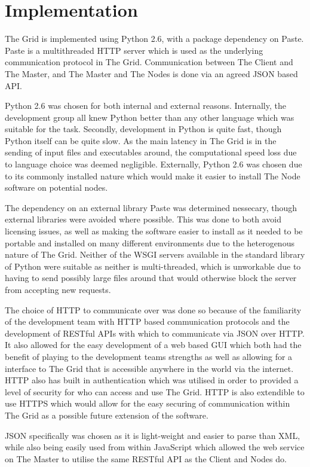 \chapter{Implementation}
The Grid is implemented using Python 2.6, with a package dependency on Paste. Paste is a multithreaded HTTP server which is used as the underlying communication protocol in The Grid. Communication between The Client and The Master, and The Master and The Nodes is done via an agreed JSON based API.

Python 2.6 was chosen for both internal and external reasons. Internally, the development group all knew Python better than any other language which was suitable for the task. Secondly, development in Python is quite fast, though Python itself can be quite slow. As the main latency in The Grid is in the sending of input files and executables around, the computational speed loss due to language choice was deemed negligible. Externally, Python 2.6 was chosen due to its commonly installed nature which would make it easier to install The Node software on potential nodes.

The dependency on an external library Paste was determined nessecary, though external libraries were avoided where possible. This was done to both avoid licensing issues, as well as making the software easier to install as it needed to be portable and installed on many different environments due to the heterogenous nature of The Grid. Neither of the WSGI servers available in the standard library of Python were suitable as neither is multi-threaded, which is unworkable due to having to send possibly large files around that would
otherwise block the server from accepting new requests.

The choice of HTTP to communicate over was done so because of the familiarity of the development team with HTTP based communication protocols and the development of RESTful APIs with which to communicate via JSON over HTTP. It also allowed for the easy development of a web based GUI which both had the benefit of playing to the development teams strengths as well as allowing for a interface to The Grid that is accessible anywhere in the world via the internet. HTTP also has built in authentication which was utilised in order to provided a level of security for who can access and use The Grid. HTTP is also extendible to use HTTPS which would allow for the easy securing of communication within The Grid as a possible future extension of the software.

JSON specifically was chosen as it is light-weight and easier to parse than XML, while also being easily used from within JavaScript which allowed the web service on The Master to utilise the same RESTful API as the Client and Nodes do. 

